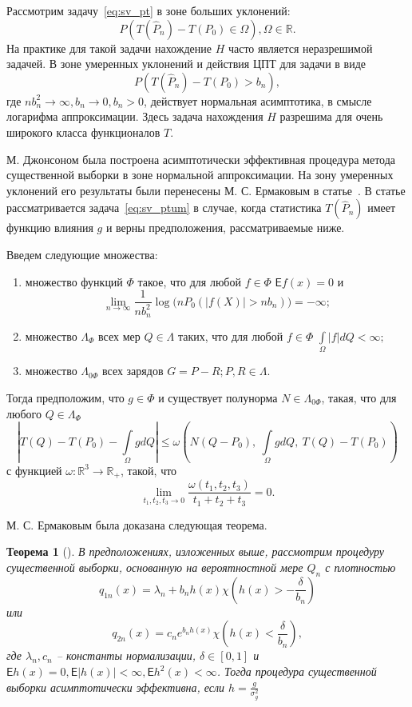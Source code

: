 \documentclass[12pt, specialist, subf, substylefile = spbu.rtx]{disser}
\newtheorem{theorem}{Теорема}
\newcommand{\Expect}{\mathsf{E}}
\begin{document}
Рассмотрим задачу~\eqref{eq:sv_pt} в зоне больших уклонений:
$$
P(T(\hat{P}_n)-T(P_0) \in \Omega), \Omega \in \mathbb{R}.
$$
На практике для такой задачи нахождение $H$ часто является неразрешимой задачей. В зоне умеренных уклонений и действия ЦПТ для задачи в виде
\begin{equation}\label{eq:sv_ptum}
P(T(\hat{P}_n)-T(P_0) > b_n), 
\end{equation}
где $nb_n^2 \to \infty, b_n \to 0, b_n > 0$, действует нормальная асимптотика, в смысле логарифма аппроксимации. Здесь задача нахождения $H$ разрешима для очень широкого класса функционалов $T$.

М. Джонсоном была построена асимптотически эффективная процедура метода существенной выборки в зоне нормальной аппроксимации. На зону умеренных уклонений его результаты были перенесены М. С. Ермаковым в статье~\cite{Ermakov}. В статье рассматривается задача~\eqref{eq:sv_ptum} в случае, когда статистика $T(\hat{P}_n)$ имеет функцию влияния $g$ и верны предположения, рассматриваемые ниже.

Введем следующие множества: 
\begin{enumerate}
\item множество функций $\Phi$ такое, что для любой $f \in \Phi$  $\Expect f(x)=0 $ и
$$
\lim\limits_{n \to \infty} \frac{1}{nb_n^2} \log \big(nP_0(|f(X)|>nb_n)\big)=-\infty;
$$

\item множество $\Lambda_\Phi$ всех мер $Q \in \Lambda$ таких, что для любой $f \in \Phi$
$
\int\limits_{\Omega} |f| dQ < \infty;
$

\item множество $\Lambda_{0\Phi}$ всех зарядов $G=P-R; P, R \in \Lambda$.

\end{enumerate}

Тогда предположим, что $g \in \Phi$ и существует полунорма $N \in \Lambda_{0\Phi}$, такая, что для любого $Q \in \Lambda_\Phi$
$$
|T(Q)-T(P_0)-\int\limits_{\Omega}g dQ| \le 
\omega\left(N(Q-P_0),\ \int\limits_{\Omega}g dQ,\ T(Q)-T(P_0) \right)
$$
с функцией $\omega\colon \mathbb{R}^3 \to \mathbb{R}_+$, такой, что
$$
\lim\limits_{t_1, t_2, t_3 \to 0} \frac{\omega(t_1, t_2, t_3)}{t_1+ t_2+t_3} = 0.
$$

М. С. Ермаковым была доказана следующая теорема.
\begin{theorem}[{\cite{Ermakov}}]\label{th:erm}
В предположениях, изложенных выше, рассмотрим процедуру существенной выборки, основанную на вероятностной мере $Q_n$ с плотностью 
$$
q_{1n}(x)=\lambda_n+b_nh(x)\chi\left(h(x)>-\frac{\delta}{b_n}\right)
$$
или
$$
q_{2n}(x)=c_ne^{b_nh(x)} \chi\left(h(x)<\frac{\delta}{b_n}\right),
$$
где $\lambda_n, c_n$ -- константы нормализации, $\delta \in [0, 1]$ и $\Expect h(x)=0, \Expect|h(x)|<\infty, \Expect h^2(x)< \infty$. Тогда процедура существенной выборки асимптотически эффективна, если $h=\frac{g}{\sigma^2_g}$

\end{theorem}
\end{document}
